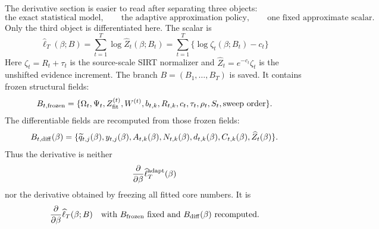 \documentclass[11pt]{article}
\numberwithin{equation}{section}
\begin{document}
The derivative section is easier to read after separating three objects:
\begin{equation}
    \text{the exact statistical model},\qquad
    \text{the adaptive approximation policy},\qquad
    \text{one fixed approximate scalar}.
    \label{eq:p25-gradteach-1}
\end{equation}
Only the third object is differentiated here.  The scalar is
\begin{equation}
\boxed{
    \widehat\ell_T(\beta;B)
    =
    \sum_{t=1}^{T}\log\widehat Z_t(\beta;B_t)
    =
    \sum_{t=1}^{T}\{\log\zeta_t(\beta;B_t)-c_t\}
}
    \label{eq:p25-gradteach-2}
\end{equation}
Here \(\zeta_t=R_t+\tau_t\) is the source-scale SIRT normalizer and
\(\widehat Z_t=e^{-c_t}\zeta_t\) is the unshifted evidence increment.  The
branch \(B=(B_1,\ldots,B_T)\) is saved.  It contains frozen structural fields:
\begin{equation}
    B_{t,\rm frozen}
    =
    \{\Omega_t,\Psi_t,Z_{\rm fit}^{(t)},W^{(t)},b_{t,k},R_{t,k},
      c_t,\tau_t,\rho_t,S_t,\text{sweep order}\}.
    \label{eq:p25-gradteach-3}
\end{equation}
The differentiable fields are recomputed from those frozen fields:
\begin{equation}
    B_{t,\rm diff}(\beta)
    =
    \{\widetilde q_{t,j}(\beta),y_{t,j}(\beta),A_{t,k}(\beta),
      N_{t,k}(\beta),d_{t,k}(\beta),C_{t,k}(\beta),
      \widehat Z_t(\beta)\}.
    \label{eq:p25-gradteach-4}
\end{equation}
Thus the derivative is neither
\begin{equation}
    \frac{\partial}{\partial\beta}
    \widehat\ell_T^{\rm adapt}(\beta)
    \label{eq:p25-gradteach-5}
\end{equation}
nor the derivative obtained by freezing all fitted core numbers.  It is
\begin{equation}
    \frac{\partial}{\partial\beta}
    \widehat\ell_T(\beta;B)
    \quad\text{with }B_{\rm frozen}\text{ fixed and }B_{\rm diff}(\beta)
    \text{ recomputed}.
    \label{eq:p25-gradteach-6}
\end{equation}
\end{document}

